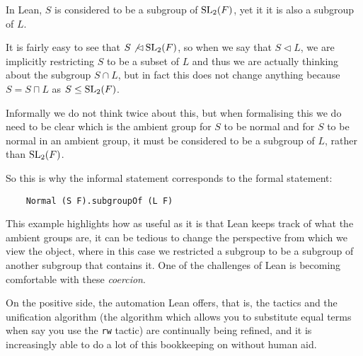 \begin{remark}
    \label{lattice}
    In Lean, $S$ is considered to be a subgroup of $\operatorname{SL}_2(F)$, yet it it is also a subgroup of $L$. 
    
    It is fairly easy to see that $S \not\lhd \operatorname{SL}_2(F)$, so when we say that $S \lhd L$, 
    we are implicitly restricting $S$ to be a subset of $L$ and thus we are actually thinking about the subgroup $S \cap L$,
    but in fact this does not change anything because $S = S \sqcap L$ as $S \le \operatorname{SL}_2(F)$.

    Informally we do not think twice about this, but when formalising this we do need to be clear which is the ambient group for $S$
    to be normal and for $S$ to be normal in an ambient group, it must be considered to be a subgroup of $L$, rather than $\operatorname{SL}_2(F)$.
    
    So this is why the informal statement corresponds to the formal statement:

    \begin{footnotesize}
    \begin{verbatim}
    Normal (S F).subgroupOf (L F) 
    \end{verbatim}
    \end{footnotesize}

    This example highlights how as useful as it is that Lean keeps track of what the ambient groups are, it can be tedious to change the perspective from which we view the object, where in this case we restricted
    a subgroup to be a subgroup of another subgroup that contains it. One of the challenges of Lean is becoming comfortable with these \textit{coercion}.
    
    On the positive side, the automation Lean offers, that is, the tactics and the unification algorithm (the algorithm which allows you to substitute equal terms when say you use the \texttt{rw} tactic) are continually being refined, 
    and it is increasingly able to do a lot of this bookkeeping on without human aid.
\end{remark}


